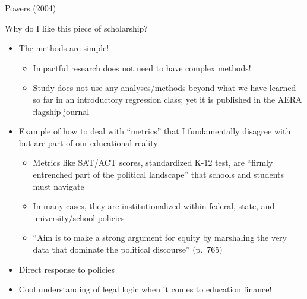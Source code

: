 \documentclass[
  8pt,
  ignorenonframetext,
  dvipsnames]{beamer}
\providecommand{\tightlist}{%
  \setlength{\itemsep}{0pt}\setlength{\parskip}{0pt}}
\let\olditem\item
\renewcommand{\item}{%
  \olditem\vspace{4pt}
}
\begin{document}
\begin{frame}{Powers (2004)}
\protect\hypertarget{powers-2004-3}{}

Why do I like this piece of scholarship?

\begin{itemize}
\tightlist
\item
  The methods are simple!

  \begin{itemize}
  \tightlist
  \item
    Impactful research does not need to have complex methods!
  \item
    Study does not use any analyses/methods beyond what we have learned
    so far in an introductory regression class; yet it is published in
    the AERA flagship journal
  \end{itemize}
\item
  Example of how to deal with ``metrics'' that I fundamentally disagree
  with but are part of our educational reality

  \begin{itemize}
  \tightlist
  \item
    Metrics like SAT/ACT scores, standardized K-12 test, are ``firmly
    entrenched part of the political landscape'' that schools and
    students must navigate
  \item
    In many cases, they are institutionalized within federal, state, and
    university/school policies
  \item
    ``Aim is to make a strong argument for equity by marshaling the very
    data that dominate the political discourse'' (p.~765)
  \end{itemize}
\item
  Direct response to policies
\item
  Cool understanding of legal logic when it comes to education finance!
\end{itemize}

\end{frame}
\end{document}
